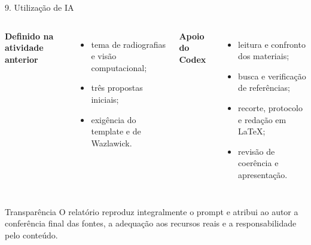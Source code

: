 \documentclass[aspectratio=169,10pt]{beamer}
\begin{document}
\begin{frame}{9. Utilização de IA}
  \begin{columns}[T,onlytextwidth]
      \textbf{\color{navy}Definido na atividade anterior}
      \begin{itemize}
        \item tema de radiografias e visão computacional;
        \item três propostas iniciais;
        \item exigência do template e de Wazlawick.
      \end{itemize}
      \textbf{\color{navy}Apoio do Codex}
      \begin{itemize}
        \item leitura e confronto dos materiais;
        \item busca e verificação de referências;
        \item recorte, protocolo e redação em \LaTeX;
        \item revisão de coerência e apresentação.
      \end{itemize}
  \end{columns}
  \vspace{0.7em}
  \begin{block}{Transparência}
    O relatório reproduz integralmente o prompt e atribui ao autor a conferência final das fontes, a adequação aos recursos reais e a responsabilidade pelo conteúdo.
  \end{block}
\end{frame}
\end{document}
